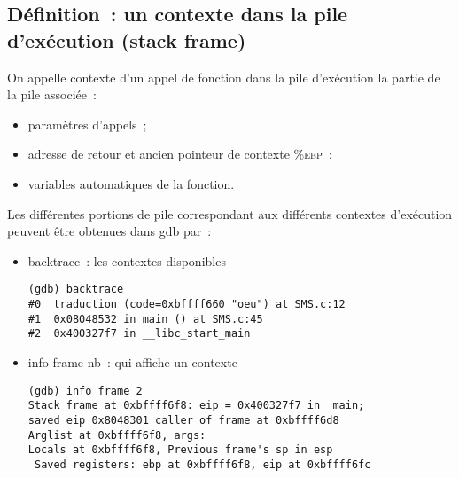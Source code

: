 \begin{frame}[fragile]
  \section{ D\'efinition~: un contexte dans la pile d'ex\'ecution (stack frame)}%
  On appelle contexte d'un appel de fonction dans la pile d'ex\'ecution la
  partie de la pile associ\'ee~:
  \begin{itemize}
  \item param\`etres d'appels~;
  \item adresse de retour et ancien pointeur de contexte \%\textsc{ebp}~;
  \item variables automatiques de la fonction.
  \end{itemize}
  \par
  Les diff\'erentes portions de pile correspondant aux diff\'erents
  contextes d'ex\'ecution peuvent \^etre obtenues dans gdb par~:
  \begin{itemize}
  \item backtrace~: les contextes disponibles
\begin{verbatim}
(gdb) backtrace
#0  traduction (code=0xbffff660 "oeu") at SMS.c:12
#1  0x08048532 in main () at SMS.c:45
#2  0x400327f7 in __libc_start_main
\end{verbatim}
  \item info frame nb~: qui affiche un contexte
\begin{verbatim}
(gdb) info frame 2
Stack frame at 0xbffff6f8: eip = 0x400327f7 in _main; 
saved eip 0x8048301 caller of frame at 0xbffff6d8  
Arglist at 0xbffff6f8, args: 
Locals at 0xbffff6f8, Previous frame's sp in esp
 Saved registers: ebp at 0xbffff6f8, eip at 0xbffff6fc
\end{verbatim}
  \end{itemize}
\end{frame}
